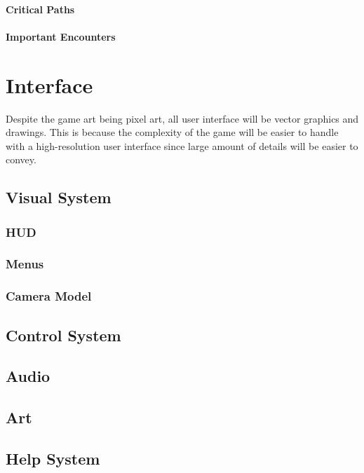 \documentclass[12pt]{article}
\begin{document}
\paragraph{Critical Paths}

\paragraph{Important Encounters}

\section{Interface}

Despite the game art being pixel art, all user interface will be vector graphics and drawings. This is because the complexity of the game will be easier to handle with a high-resolution user interface since large amount of details will be easier to convey. 

\subsection{Visual System}

\subsubsection{HUD}

\subsubsection{Menus}

\subsubsection{Camera Model}

\subsection{Control System}

\subsection{Audio}

\subsection{Art}

\subsection{Help System}
\end{document}
